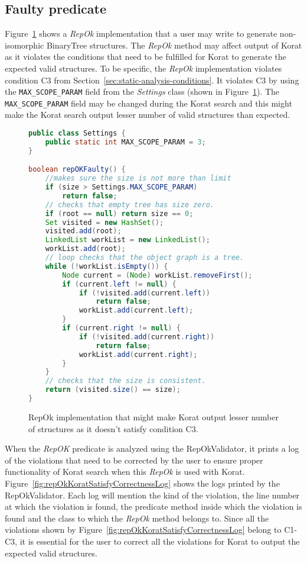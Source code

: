 \subsection{Faulty predicate}
\label{sec:faulty-predicate}
Figure~\ref{fig:repOkKoratSatisfyCorrectness} shows a \emph{RepOk}
implementation that a user may write to generate non-isomorphic
BinaryTree structures. The \emph{RepOk} method may affect output of
Korat as it violates the conditions that need to be fulfilled for
Korat to generate the expected valid structures. To be specific, the
\emph{RepOk} implementation violates condition C3 from
Section~\ref{sec:static-analysis-conditions}. It violates C3 by using
the \texttt{MAX\_SCOPE\_PARAM} field from the \emph{Settings} class
(shown in Figure~\ref{fig:repOkKoratSatisfyCorrectness}). The
\texttt{MAX\_SCOPE\_PARAM} field may be changed during the Korat search
and this might make the Korat search output lesser number of valid
structures than expected.

\begin{figure}
\centering
\begin{lstlisting}[language=Java]
public class Settings {
    public static int MAX_SCOPE_PARAM = 3;
}

boolean repOKFaulty() {
    //makes sure the size is not more than limit
    if (size > Settings.MAX_SCOPE_PARAM) 
        return false;
    // checks that empty tree has size zero.
    if (root == null) return size == 0;
    Set visited = new HashSet();
    visited.add(root);
    LinkedList workList = new LinkedList();
    workList.add(root);
    // loop checks that the object graph is a tree.
    while (!workList.isEmpty()) {
        Node current = (Node) workList.removeFirst();
        if (current.left != null) {
            if (!visited.add(current.left))
                return false;
            workList.add(current.left);
        }
        if (current.right != null) {
            if (!visited.add(current.right))
                return false;
            workList.add(current.right);
        }
    }
    // checks that the size is consistent.
    return (visited.size() == size);
}

\end{lstlisting}
\caption{RepOk implementation that might make Korat output lesser number of structures as it doesn’t satisfy condition C3.}
\label{fig:repOkKoratSatisfyCorrectness}
\end{figure}

\para When the \emph{RepOK} predicate is analyzed using the
RepOkValidator, it prints a log of the violations that need to be
corrected by the user to ensure proper functionality of Korat search
when this \emph{RepOk} is used with
Korat. Figure~\ref{fig:repOkKoratSatisfyCorrectnessLog} shows the logs
printed by the RepOkValidator. Each log will mention the kind of the
violation, the line number at which the violation is found, the
predicate method inside which the violation is found and the class to
which the \emph{RepOk} method belongs to. Since all the violations
shown by Figure~\ref{fig:repOkKoratSatisfyCorrectnessLog} belong to
C1-C3, it is essential for the user to correct all the violations for
Korat to output the expected valid structures.

